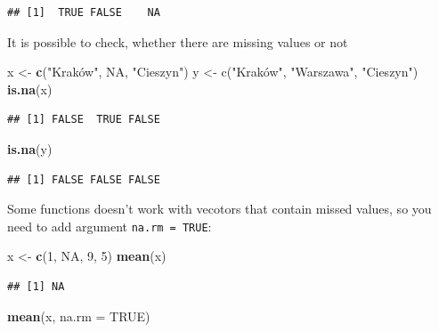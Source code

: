 \documentclass[
]{book}
\newenvironment{Shaded}{\begin{snugshade}}{\end{snugshade}}
\newcommand{\DataTypeTok}[1]{\textcolor[rgb]{0.13,0.29,0.53}{#1}}
\newcommand{\DecValTok}[1]{\textcolor[rgb]{0.00,0.00,0.81}{#1}}
\newcommand{\KeywordTok}[1]{\textcolor[rgb]{0.13,0.29,0.53}{\textbf{#1}}}
\newcommand{\NormalTok}[1]{#1}
\newcommand{\OtherTok}[1]{\textcolor[rgb]{0.56,0.35,0.01}{#1}}
\newcommand{\StringTok}[1]{\textcolor[rgb]{0.31,0.60,0.02}{#1}}
\begin{document}
\begin{verbatim}
## [1]  TRUE FALSE    NA
\end{verbatim}

It is possible to check, whether there are missing values or not

\begin{Shaded}
\begin{Highlighting}[]
\NormalTok{x <-}\StringTok{ }\KeywordTok{c}\NormalTok{(}\StringTok{"Kraków", NA, "}\NormalTok{Cieszyn}\StringTok{")}
\StringTok{y <- c("}\NormalTok{Kraków", }\StringTok{"Warszawa"}\NormalTok{, }\StringTok{"Cieszyn"}\NormalTok{)}
\KeywordTok{is.na}\NormalTok{(x)}
\end{Highlighting}
\end{Shaded}

\begin{verbatim}
## [1] FALSE  TRUE FALSE
\end{verbatim}

\begin{Shaded}
\begin{Highlighting}[]
\KeywordTok{is.na}\NormalTok{(y)}
\end{Highlighting}
\end{Shaded}

\begin{verbatim}
## [1] FALSE FALSE FALSE
\end{verbatim}

Some functions doesn't work with vecotors that contain missed values, so you need to add argument \texttt{na.rm\ =\ TRUE}:

\begin{Shaded}
\begin{Highlighting}[]
\NormalTok{x <-}\StringTok{ }\KeywordTok{c}\NormalTok{(}\DecValTok{1}\NormalTok{, }\OtherTok{NA}\NormalTok{, }\DecValTok{9}\NormalTok{, }\DecValTok{5}\NormalTok{)}
\KeywordTok{mean}\NormalTok{(x)}
\end{Highlighting}
\end{Shaded}

\begin{verbatim}
## [1] NA
\end{verbatim}

\begin{Shaded}
\begin{Highlighting}[]
\KeywordTok{mean}\NormalTok{(x, }\DataTypeTok{na.rm =} \OtherTok{TRUE}\NormalTok{)}
\end{Highlighting}
\end{Shaded}
\end{document}
